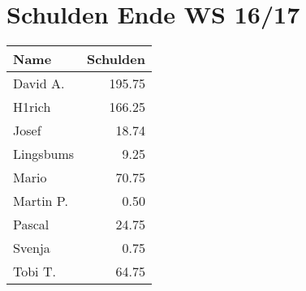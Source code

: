 \documentclass[11pt]{article}
\author{Berthold Blatt Lorke}
\date{\today}
\title{}
\begin{document}
\section{Schulden Ende WS 16/17}
\label{sec:orgbe37de1}


\begin{center}
\begin{tabular}{lr}
Name & Schulden\\
\hline
David A. & 195.75\\
H1rich & 166.25\\
Josef & 18.74\\
Lingsbums & 9.25\\
Mario & 70.75\\
Martin P. & 0.50\\
Pascal & 24.75\\
Svenja & 0.75\\
Tobi T. & 64.75\\
\end{tabular}
\end{center}
\end{document}
